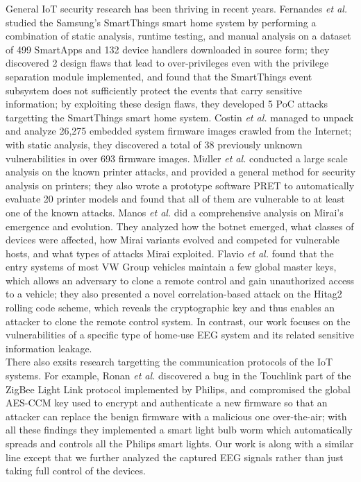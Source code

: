 General IoT security research has been thriving in recent years. Fernandes \emph{et al.} \cite{fernandes2016security} studied the Samsung's SmartThings smart home system by performing a combination of static analysis, runtime testing, and manual analysis on a dataset of 499 SmartApps and 132 device handlers downloaded in source form; they discovered 2 design flaws that lead to over-privileges even with the privilege separation module implemented, and found that the SmartThings event subsystem does not sufficiently protect the events that carry sensitive information; by exploiting these design flaws, they developed 5 PoC attacks targetting the SmartThings smart home system.  Costin \emph{et al.} \cite{costin2014large} managed to unpack and analyze 26,275 embedded system firmware images crawled from the Internet; with static analysis, they discovered a total of 38 previously unknown vulnerabilities in over 693 firmware images. M$\ddot{u}$ller \emph{et al.} \cite{muller2017sok} conducted a large scale analysis on the known printer attacks, and provided a general method for security analysis on printers; they also wrote a prototype software PRET to automatically evaluate 20 printer models and found that all of them are vulnerable to at least one of the known attacks. Manos \emph{et al.} \cite{antonakakis2017understanding} did a comprehensive analysis on Mirai's emergence and evolution. They analyzed how the botnet emerged, what classes of devices were affected, how Mirai variants evolved and competed for vulnerable hosts, and what types of attacks Mirai exploited.  Flavio \emph{et al.}  \cite{garcia2016lock} found that the entry systems of most VW Group vehicles maintain a few global master keys, which allows an adversary to clone a remote control and gain unauthorized access to a vehicle; they also presented a novel correlation-based attack on the Hitag2 rolling code scheme, which reveals the cryptographic key and thus enables an attacker to clone the remote control system. In contrast, our work focuses on the vulnerabilities of a specific type of home-use EEG system and its related sensitive information leakage. \\
%
\indent There also exsits research targetting the communication protocols of the IoT systems. For example, Ronan \emph{et al.} \cite{ronen2017iot} discovered a bug in the Touchlink part of the ZigBee Light Link protocol implemented by Philips, and compromised the global AES-CCM key used to encrypt and authenticate a new firmware so that an attacker can replace the benign firmware with a malicious one over-the-air; with all these findings they implemented a smart light bulb worm which automatically spreads and controls all the Philips smart lights. Our work is along with a similar line except that we further analyzed the captured EEG signals rather than just taking full control of the devices.
